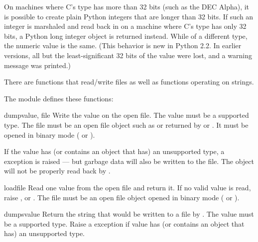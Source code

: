  On machines where C's  type has more than
32 bits (such as the DEC Alpha), it is possible to create plain Python
integers that are longer than 32 bits.
If such an integer is marshaled and read back in on a machine where
C's  type has only 32 bits, a Python long integer object
is returned instead.  While of a different type, the numeric value is
the same.  (This behavior is new in Python 2.2.  In earlier versions,
all but the least-significant 32 bits of the value were lost, and a
warning message was printed.)

There are functions that read/write files as well as functions
operating on strings.

The module defines these functions:

\begin{funcdesc}{dump}{value, file}
  Write the value on the open file.  The value must be a supported
  type.  The file must be an open file object such as
   or returned by  or
  .  It must be opened in binary mode
  ( or ).

  If the value has (or contains an object that has) an unsupported type,
  a  exception is raised --- but garbage data
  will also be written to the file.  The object will not be properly
  read back by .

\end{funcdesc}

\begin{funcdesc}{load}{file}
  Read one value from the open file and return it.  If no valid value
  is read, raise ,  or
  .  The file must be an open file object opened
  in binary mode ( or ).

\end{funcdesc}

\begin{funcdesc}{dumps}{value}
  Return the string that would be written to a file by
  .  The value must be a supported
  type.  Raise a  exception if value has (or
  contains an object that has) an unsupported type.

\end{funcdesc}

